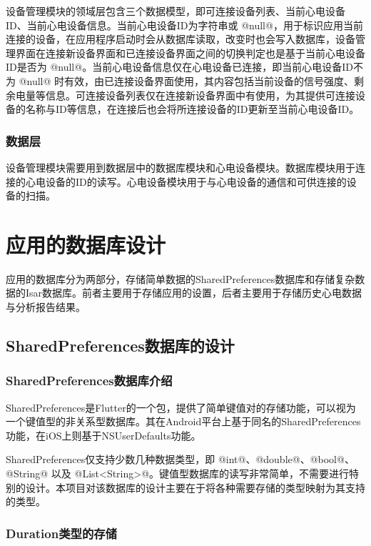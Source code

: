 设备管理模块的领域层包含三个数据模型，即可连接设备列表、当前心电设备ID、当前心电设备信息。当前心电设备ID为字符串或 @null@，用于标识应用当前连接的设备，在应用程序启动时会从数据库读取，改变时也会写入数据库，设备管理界面在连接新设备界面和已连接设备界面之间的切换判定也是基于当前心电设备ID是否为 @null@。当前心电设备信息仅在心电设备已连接，即当前心电设备ID不为 @null@ 时有效，由已连接设备界面使用，其内容包括当前设备的信号强度、剩余电量等信息。可连接设备列表仅在连接新设备界面中有使用，为其提供可连接设备的名称与ID等信息，在连接后也会将所连接设备的ID更新至当前心电设备ID。

\subsubsection{数据层}

设备管理模块需要用到数据层中的数据库模块和心电设备模块。数据库模块用于连接的心电设备的ID的读写。心电设备模块用于与心电设备的通信和可供连接的设备的扫描。


\section{应用的数据库设计}\label{sec:db-design}

应用的数据库分为两部分，存储简单数据的SharedPreferences数据库和存储复杂数据的Isar数据库。前者主要用于存储应用的设置，后者主要用于存储历史心电数据与分析报告结果。

\subsection{SharedPreferences数据库的设计}\label{subsec:shared-preferences}

\subsubsection{SharedPreferences数据库介绍}\label{subsubsec:shared-preferences-intro}

SharedPreferences是Flutter的一个包，提供了简单键值对的存储功能，可以视为一个键值型的非关系型数据库。其在Android平台上基于同名的SharedPreferences功能，在iOS上则基于NSUserDefaults功能。

SharedPreferences仅支持少数几种数据类型，即 @int@、@double@、@bool@、@String@ 以及 @List<String>@。键值型数据库的读写非常简单，不需要进行特别的设计。本项目对该数据库的设计主要在于将各种需要存储的类型映射为其支持的类型。

\subsubsection{Duration类型的存储}\label{subsubsec:duration-storage}

